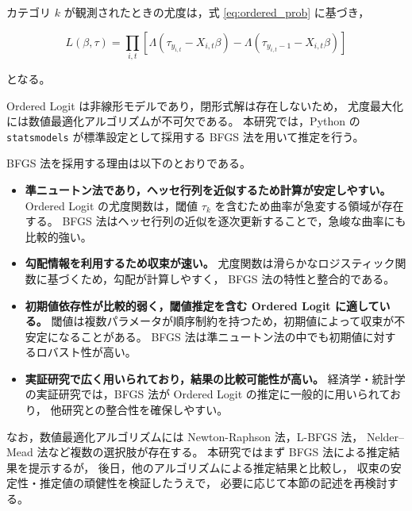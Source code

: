 カテゴリ $k$ が観測されたときの尤度は，式 \eqref{eq:ordered_prob} に基づき，

\begin{equation}
L(\beta, \tau)
=
\prod_{i,t}
\left[
\Lambda(\tau_{y_{i,t}} - X_{i,t}\beta)
-
\Lambda(\tau_{y_{i,t}-1} - X_{i,t}\beta)
\right]
\label{eq:ordered_likelihood}
\end{equation}

となる。

Ordered Logit は非線形モデルであり，閉形式解は存在しないため，
尤度最大化には数値最適化アルゴリズムが不可欠である。
本研究では，Python の \texttt{statsmodels} が標準設定として採用する
BFGS 法を用いて推定を行う。

BFGS 法を採用する理由は以下のとおりである。

\begin{itemize}
    \item \textbf{準ニュートン法であり，ヘッセ行列を近似するため計算が安定しやすい。}  
    Ordered Logit の尤度関数は，閾値 $\tau_k$ を含むため曲率が急変する領域が存在する。  
    BFGS 法はヘッセ行列の近似を逐次更新することで，急峻な曲率にも比較的強い。

    \item \textbf{勾配情報を利用するため収束が速い。}  
    尤度関数は滑らかなロジスティック関数に基づくため，勾配が計算しやすく，  
    BFGS 法の特性と整合的である。

    \item \textbf{初期値依存性が比較的弱く，閾値推定を含む Ordered Logit に適している。}  
    閾値は複数パラメータが順序制約を持つため，初期値によって収束が不安定になることがある。  
    BFGS 法は準ニュートン法の中でも初期値に対するロバスト性が高い。

    \item \textbf{実証研究で広く用いられており，結果の比較可能性が高い。}  
    経済学・統計学の実証研究では，BFGS 法が Ordered Logit の推定に一般的に用いられており，  
    他研究との整合性を確保しやすい。
\end{itemize}

なお，数値最適化アルゴリズムには Newton-Raphson 法，L-BFGS 法，
Nelder–Mead 法など複数の選択肢が存在する。
本研究ではまず BFGS 法による推定結果を提示するが，
後日，他のアルゴリズムによる推定結果と比較し，
収束の安定性・推定値の頑健性を検証したうえで，
必要に応じて本節の記述を再検討する。



